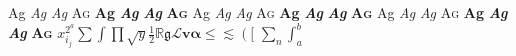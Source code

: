 {\Huge {\rmfamily\mdseries\upshape Ag} {\rmfamily\mdseries\itshape Ag} {\rmfamily\mdseries\slshape Ag} {\rmfamily\mdseries\scshape Ag} {\rmfamily\bfseries\upshape Ag} {\rmfamily\bfseries\itshape Ag} {\rmfamily\bfseries\slshape Ag} {\rmfamily\bfseries\scshape Ag} {\sffamily\mdseries\upshape Ag} {\sffamily\mdseries\itshape Ag} {\sffamily\mdseries\slshape Ag} {\sffamily\mdseries\scshape Ag} {\sffamily\bfseries\upshape Ag} {\sffamily\bfseries\itshape Ag} {\sffamily\bfseries\slshape Ag} {\sffamily\bfseries\scshape Ag} {\ttfamily\mdseries\upshape Ag} {\ttfamily\mdseries\itshape Ag} {\ttfamily\mdseries\slshape Ag} {\ttfamily\mdseries\scshape Ag} {\ttfamily\bfseries\upshape Ag} {\ttfamily\bfseries\itshape Ag} {\ttfamily\bfseries\slshape Ag} {\ttfamily\bfseries\scshape Ag}  $x^{2^a}_{i_j}\sum\int\prod\sqrt{y}\frac{1}{2}\mathbb{R}\mathfrak{g}\mathcal{L}\mathbf{v}\boldsymbol{\alpha}\leqslant\lesssim\left(\Bigg[\right.$ $\displaystyle\sum_{n}\int_a^b$}\par
